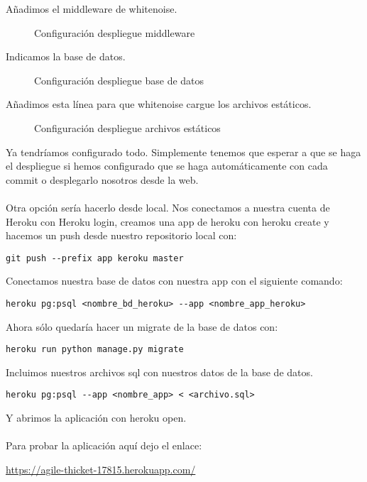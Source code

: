 Añadimos el middleware de whitenoise.

\begin{figure}[H]
  \centering
  \noindent{}
  \caption{Configuración despliegue middleware}
\end{figure}

Indicamos la base de datos.

\begin{figure}[H]
  \centering
  \noindent{}
  \caption{Configuración despliegue base de datos}
\end{figure}

Añadimos esta línea para que whitenoise cargue los archivos estáticos.

\begin{figure}[H]
  \centering
  \noindent{}
  \caption{Configuración despliegue archivos estáticos}
\end{figure}

Ya tendríamos configurado todo. Simplemente tenemos que esperar a que se haga el despliegue si hemos configurado que se haga automáticamente con cada commit o desplegarlo nosotros desde la web.\\\\

Otra opción sería hacerlo desde local.
Nos conectamos a nuestra cuenta de Heroku con Heroku login, creamos una app de heroku con heroku create y hacemos un push desde nuestro repositorio local con:
\begin{lstlisting}
git push --prefix app keroku master
\end{lstlisting}

Conectamos nuestra base de datos con nuestra app con el siguiente comando:
\begin{lstlisting}
heroku pg:psql <nombre_bd_heroku> --app <nombre_app_heroku>
\end{lstlisting}

Ahora sólo quedaría hacer un migrate de la base de datos con:
\begin{lstlisting}
heroku run python manage.py migrate
\end{lstlisting}

Incluimos nuestros archivos sql con nuestros datos de la base de datos.
\begin{lstlisting}
heroku pg:psql --app <nombre_app> < <archivo.sql>
\end{lstlisting}
Y abrimos la aplicación con heroku open.\\\\

Para probar la aplicación aquí dejo el enlace:

\url{https://agile-thicket-17815.herokuapp.com/}